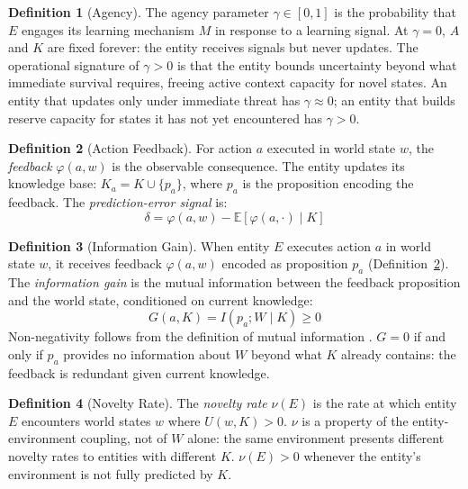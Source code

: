 \documentclass[11pt]{article}
\theoremstyle{definition}
\newtheorem{definition}{Definition}
\begin{document}
\begin{definition}[Agency]
\label{def:agency}
The agency parameter $\gamma \in [0,1]$ is the probability that $E$
engages its learning mechanism $M$ in response to a learning signal.
At $\gamma = 0$, $A$ and $K$ are fixed forever: the entity receives
signals but never updates. The operational signature of $\gamma > 0$ is
that the entity bounds uncertainty beyond what immediate survival
requires, freeing active context capacity for novel states. An entity
that updates only under immediate threat has $\gamma \approx 0$; an
entity that builds reserve capacity for states it has not yet
encountered has $\gamma > 0$.
\end{definition}

\begin{definition}[Action Feedback]
\label{def:feedback}
For action $a$ executed in world state $w$, the \emph{feedback}
$\varphi(a, w)$ is the observable consequence. The entity updates its
knowledge base: $K_a = K \cup \{p_a\}$, where $p_a$ is the
proposition encoding the feedback. The \emph{prediction-error signal} is:
\[
\delta = \varphi(a, w) - \mathbb{E}[\varphi(a, \cdot) \mid K]
\]
\end{definition}

\begin{definition}[Information Gain]
\label{def:gain}
When entity $E$ executes action $a$ in world state $w$, it receives
feedback $\varphi(a, w)$ encoded as proposition $p_a$
(Definition~\ref{def:feedback}). The \emph{information gain} is the
mutual information between the feedback proposition and the world
state, conditioned on current knowledge:
\[
G(a, K) = I(p_a; W \mid K) \geq 0
\]
Non-negativity follows from the definition of mutual information
\cite{Cover2006}. $G = 0$ if and only if $p_a$ provides no
information about $W$ beyond what $K$ already contains: the feedback
is redundant given current knowledge.
\end{definition}

\begin{definition}[Novelty Rate]
\label{def:novelty}
The \emph{novelty rate} $\nu(E)$ is the rate at which entity $E$
encounters world states $w$ where $U(w, K) > 0$. $\nu$ is a property
of the entity-environment coupling, not of $W$ alone: the same
environment presents different novelty rates to entities with different
$K$. $\nu(E) > 0$ whenever the entity's environment is not fully
predicted by $K$.
\end{definition}
\end{document}
